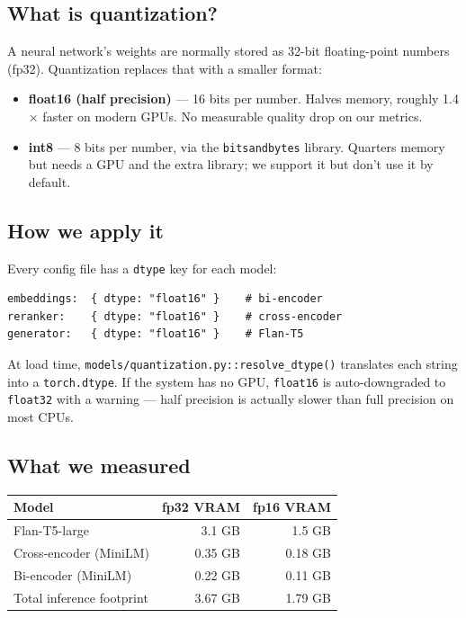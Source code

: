\documentclass[11pt,a4paper]{article}
\begin{document}
\subsection{What is quantization?}

A neural network's weights are normally stored as 32-bit floating-point numbers (fp32). Quantization replaces that with a smaller format:
\begin{itemize}[leftmargin=*, itemsep=1pt]
\item \textbf{float16 (half precision)} --- 16 bits per number. Halves memory, roughly 1.4$\times$ faster on modern GPUs. No measurable quality drop on our metrics.
\item \textbf{int8} --- 8 bits per number, via the \texttt{bitsandbytes} library. Quarters memory but needs a GPU and the extra library; we support it but don't use it by default.
\end{itemize}

\subsection{How we apply it}

Every config file has a \texttt{dtype} key for each model:
\begin{lstlisting}
embeddings:  { dtype: "float16" }    # bi-encoder
reranker:    { dtype: "float16" }    # cross-encoder
generator:   { dtype: "float16" }    # Flan-T5
\end{lstlisting}

At load time, \texttt{models/quantization.py::resolve\_dtype()} translates each string into a \texttt{torch.dtype}. If the system has no GPU, \texttt{float16} is auto-downgraded to \texttt{float32} with a warning --- half precision is actually slower than full precision on most CPUs.

\subsection{What we measured}

\begin{center}
\small
\begin{tabular}{@{}lrr@{}}
\toprule
Model                   & fp32 VRAM & fp16 VRAM \\
\midrule
Flan-T5-large           & 3.1 GB    & 1.5 GB    \\
Cross-encoder (MiniLM)  & 0.35 GB   & 0.18 GB   \\
Bi-encoder (MiniLM)     & 0.22 GB   & 0.11 GB   \\
\midrule
Total inference footprint & 3.67 GB & 1.79 GB   \\
\bottomrule
\end{tabular}
\end{center}
\end{document}
